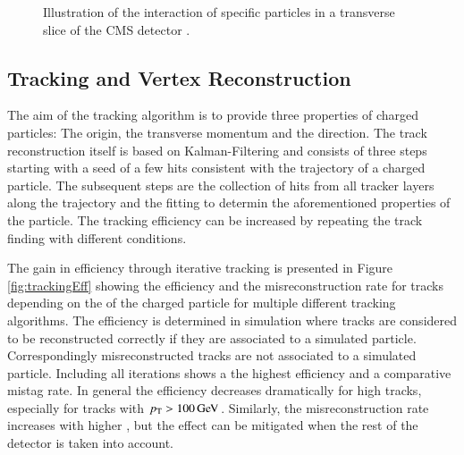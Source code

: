 \begin{figure}[htbp!]
  \begin{center}
\caption{Illustration of the interaction of specific particles in a transverse slice of the CMS detector \cite{Sirunyan:2017ulk}.
  \label{fig:pflow}}
  \end{center}
\end{figure}

\subsection{Tracking and Vertex Reconstruction}

The aim of the tracking algorithm is to provide three properties of charged particles: The origin, the transverse momentum and the direction.
The track reconstruction itself is based on Kalman-Filtering \cite{Adam:934067} and consists of three steps starting with a seed of a few hits consistent with the trajectory of a charged particle.
The subsequent steps are the collection of hits from all tracker layers along the trajectory and the fitting to determin the aforementioned properties of the particle.
The tracking efficiency can be increased by repeating the track finding with different conditions.

The gain in efficiency through iterative tracking is presented in Figure \ref{fig:trackingEff} showing the efficiency and the misreconstruction rate for tracks depending on the \pt of the charged particle for 
multiple different tracking algorithms. The efficiency is determined in simulation where tracks are considered to be reconstructed correctly if they are associated to a simulated particle. Correspondingly 
misreconstructed tracks are not associated to a simulated particle. 
Including all iterations shows a the highest efficiency and a comparative mistag rate. In general the efficiency decreases dramatically for high \pt tracks, especially for tracks with $p_{\mathrm{T}} > 100 \,\text{Ge\hspace{-.08em}V}$.
Similarly, the misreconstruction rate increases with higher \pt, but the effect can be mitigated when the rest of the detector is taken into account.

